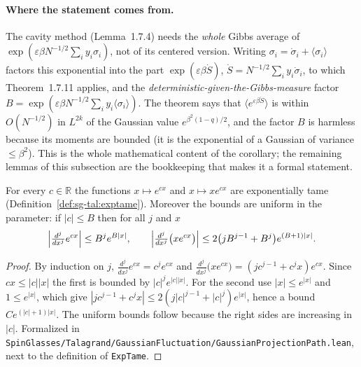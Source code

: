 \paragraph{Where the statement comes from.}
The cavity method (Lemma~1.7.4) needs the \emph{whole} Gibbs average of $\exp(\varepsilon\beta N^{-1/2}\sum_iy_i\sigma_i)$, not of its centered version.
Writing $\sigma_i=\dot\sigma_i+\langle\sigma_i\rangle$ factors this exponential into the part $\exp(\varepsilon\beta\dot S)$, $\dot S=N^{-1/2}\sum_iy_i\dot\sigma_i$,
to which Theorem~1.7.11 applies, and the \emph{deterministic-given-the-Gibbs-measure} factor
$B=\exp(\varepsilon\beta N^{-1/2}\sum_iy_i\langle\sigma_i\rangle)$.  The theorem says that $\langle e^{\varepsilon\beta\dot S}\rangle$ is within $O(N^{-1/2})$ in $L^{2k}$ of the Gaussian value $e^{\beta^2(1-q)/2}$,
and the factor $B$ is harmless because its moments are bounded (it is the exponential of a Gaussian of variance $\le\beta^2$).  This is the whole mathematical content of the corollary; the remaining lemmas of this subsection
are the bookkeeping that makes it a formal statement.

\begin{lemma}
\label{lem:sg-tal:exptame-instances}
  \leanok
{}
For every $c\in\mathbb R$ the functions $x\mapsto e^{cx}$ and $x\mapsto xe^{cx}$ are exponentially tame (Definition~\ref{def:sg-tal:exptame}).  Moreover the bounds are uniform in the parameter: if $|c|\le B$ then for all $j$ and $x$
\[
\Bigl|\tfrac{d^j}{dx^j}e^{cx}\Bigr|\le B^je^{B|x|},\qquad
\Bigl|\tfrac{d^j}{dx^j}\bigl(xe^{cx}\bigr)\Bigr|\le2\bigl(jB^{j-1}+B^j\bigr)e^{(B+1)|x|}.
\]
\end{lemma}
\begin{proof}
  \leanok
By induction on $j$, $\frac{d^j}{dx^j}e^{cx}=c^je^{cx}$ and $\frac{d^j}{dx^j}\bigl(xe^{cx}\bigr)=(jc^{j-1}+c^jx)e^{cx}$.  Since $cx\le|c||x|$ the first is bounded by $|c|^je^{|c||x|}$.
For the second use $|x|\le e^{|x|}$ and $1\le e^{|x|}$, which give $|jc^{j-1}+c^jx|\le 2(j|c|^{j-1}+|c|^j)e^{|x|}$, hence a bound $Ce^{(|c|+1)|x|}$.  The uniform bounds follow because the right sides are increasing in $|c|$.
Formalized in \texttt{SpinGlasses/Talagrand/GaussianFluctuation/GaussianProjectionPath.lean}, next to the definition of \texttt{ExpTame}.
\end{proof}

